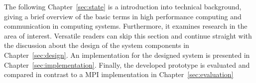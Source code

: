 The following Chapter~\ref{sec:state} is a introduction
into technical background, giving a brief overview of the basic terms
in high performance computing and communication in computing
systems. Furthermore, it examines research in the area of
interest. Versatile readers can skip this section and continue
straight with the discussion about the design of the system components
in Chapter~\ref{sec:design}.  An implementation for the designed
system is presented in Chapter~\ref{sec:implementation}.  Finally, the
developed prototype is evaluated and compared in contrast to a MPI
implementation in Chapter~\ref{sec:evaluation}



\cleardoublepage

